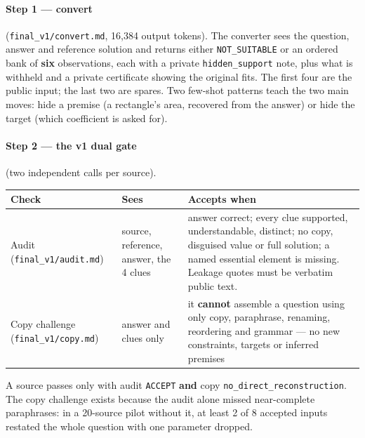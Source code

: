 \documentclass[11pt,a4paper]{article}
\newcommand{\code}[1]{\texttt{#1}}
\begin{document}
\paragraph{Step 1 --- convert} (\code{final\_v1/convert.md}, 16,384 output tokens). The converter sees the question, answer and reference solution and returns either \code{NOT\_SUITABLE} or an ordered bank of \textbf{six} observations, each with a private \code{hidden\_support} note, plus what is withheld and a private certificate showing the original fits. The first four are the public input; the last two are spares. Two few-shot patterns teach the two main moves: hide a premise (a rectangle's area, recovered from the answer) or hide the target (which coefficient is asked for).

\paragraph{Step 2 --- the v1 dual gate} (two independent calls per source).

\begin{table}[H]
\centering\small
\begin{tabularx}{\textwidth}{@{}p{3.2cm}p{3.3cm}L@{}}
\toprule
Check & Sees & Accepts when \\
\midrule
Audit (\code{final\_v1/audit.md}) & source, reference, answer, the 4 clues & answer correct; every clue supported, understandable, distinct; no copy, disguised value or full solution; a named essential element is missing. Leakage quotes must be verbatim public text. \\
Copy challenge (\code{final\_v1/copy.md}) & answer and clues only & it \textbf{cannot} assemble a question using only copy, paraphrase, renaming, reordering and grammar --- no new constraints, targets or inferred premises \\
\bottomrule
\end{tabularx}
\end{table}

A source passes only with audit \code{ACCEPT} \textbf{and} copy \code{no\_direct\_reconstruction}. The copy challenge exists because the audit alone missed near-complete paraphrases: in a 20-source pilot without it, at least 2 of 8 accepted inputs restated the whole question with one parameter dropped.
\end{document}
